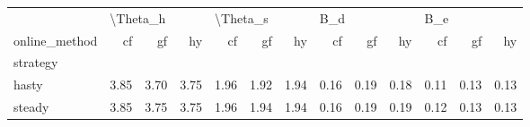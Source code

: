 \begin{tabular}{lrrrrrrrrrrrr}
\toprule
{} & \multicolumn{3}{l}{\textbackslash Theta\_h} & \multicolumn{3}{l}{\textbackslash Theta\_s} & \multicolumn{3}{l}{B\_d} & \multicolumn{3}{l}{B\_e} \\
online\_method &       cf &   gf &   hy &       cf &   gf &   hy &   cf &   gf &   hy &   cf &   gf &   hy \\
strategy &          &      &      &          &      &      &      &      &      &      &      &      \\
\midrule
hasty    &     3.85 & 3.70 & 3.75 &     1.96 & 1.92 & 1.94 & 0.16 & 0.19 & 0.18 & 0.11 & 0.13 & 0.13 \\
steady   &     3.85 & 3.75 & 3.75 &     1.96 & 1.94 & 1.94 & 0.16 & 0.19 & 0.19 & 0.12 & 0.13 & 0.13 \\
\bottomrule
\end{tabular}
